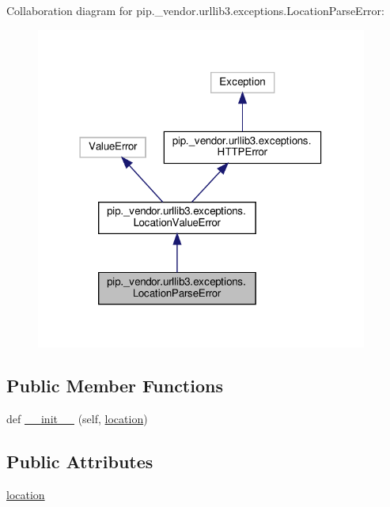 Collaboration diagram for pip.\+\_\+vendor.\+urllib3.\+exceptions.\+Location\+Parse\+Error\+:
\nopagebreak
\begin{figure}[H]
\begin{center}
\leavevmode
\includegraphics[width=309pt]{classpip_1_1__vendor_1_1urllib3_1_1exceptions_1_1LocationParseError__coll__graph}
\end{center}
\end{figure}
\subsection*{Public Member Functions}
\begin{DoxyCompactItemize}
\item 
def \hyperlink{classpip_1_1__vendor_1_1urllib3_1_1exceptions_1_1LocationParseError_a445a0a3d2d862fdf88ca98271f90b4e0}{\+\_\+\+\_\+init\+\_\+\+\_\+} (self, \hyperlink{classpip_1_1__vendor_1_1urllib3_1_1exceptions_1_1LocationParseError_ae396c88fe3f8b1c284388416caf7f358}{location})
\end{DoxyCompactItemize}
\subsection*{Public Attributes}
\begin{DoxyCompactItemize}
\item 
\hyperlink{classpip_1_1__vendor_1_1urllib3_1_1exceptions_1_1LocationParseError_ae396c88fe3f8b1c284388416caf7f358}{location}
\end{DoxyCompactItemize}


